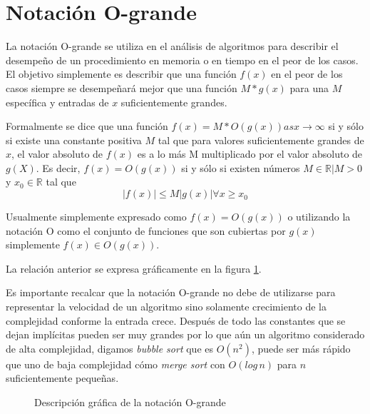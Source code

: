 \section{Notación O-grande} \label{o-grande}
La notación O-grande se utiliza en el análisis de algoritmos para describir el desempeño de un procedimiento en memoria o en tiempo en el peor de los casos. El objetivo simplemente es describir que una función $f(x)$ en el peor de los casos siempre se desempeñará mejor que una función $M*g(x)$ para una $M$ específica y entradas de $x$ suficientemente grandes.

Formalmente se dice que una función $f(x) =  M*O(g(x)) as x \to \infty$  si y sólo si existe una constante positiva $M$ tal que para valores suficientemente grandes de $x$, el valor absoluto de $f(x)$ es a lo más M multiplicado por el valor absoluto de $g(X)$. Es decir,   $f(x) = O(g(x))$ si y sólo si existen números $M \in \mathbb{R} | M > 0	$ y $x_0 \in \mathbb{R}$ tal que \[|f(x)| \leq M|g(x)| \forall x \geq x_0 \]

Usualmente simplemente expresado como $f(x) = O(g(x))$ o utilizando la notación O como el conjunto de funciones que son cubiertas por $g(x)$ simplemente $f(x) \in O(g(x))$.

La relación anterior se expresa gráficamente en la figura \ref{fig:o-grande}.

Es importante recalcar que la notación O-grande no debe de utilizarse para representar la velocidad de un algoritmo sino solamente crecimiento de la complejidad conforme la entrada crece. Después de todo las constantes que se dejan implícitas pueden ser muy grandes por lo que aún un algoritmo considerado de alta complejidad, digamos \emph{bubble sort} que es $O(n^2)$, puede ser más rápido que uno de baja complejidad cómo \emph{merge sort} con $O(log\,n)$ para $n$ suficientemente pequeñas.

\begin{figure}
\centering
{}
\caption{Descripción gráfica de la notación O-grande}
\label{fig:o-grande}
\end{figure}

